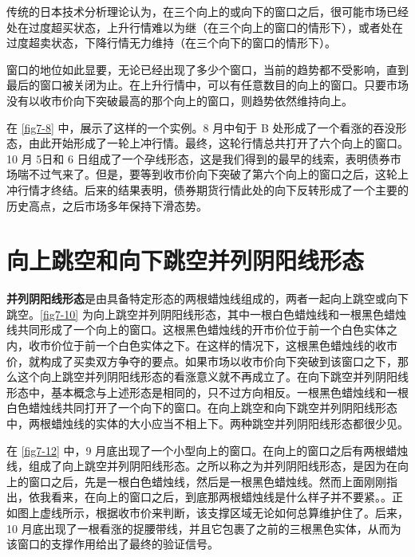 传统的日本技术分析理论认为，在三个向上的或向下的窗口之后，很可能市场已经处在过度超买状态，上升行情难以为继（在三个向上的窗口的情形下），或者处在过度超卖状态，下降行情无力维持（在三个向下的窗口的情形下）。

窗口的地位如此显要，无论已经出现了多少个窗口，当前的趋势都不受影响，直到最后的窗口被关闭为止。在上升行情中，可以有任意数目的向上的窗口。只要市场没有以收市价向下突破最高的那个向上的窗口，则趋势依然维持向上。

在 \autoref{fig7-8} 中，展示了这样的一个实例。8 月中旬于 B 处形成了一个看涨的吞没形态，由此开始形成了一轮上冲行情。最终，这轮行情总共打开了六个向上的窗口。10 月  5日和 6 日组成了一个孕线形态，这是我们得到的最早的线索，表明债券市场喘不过气来了。但是，要等到收市价向下突破了第六个向上的窗口之后，这轮上冲行情才终结。后来的结果表明，债券期货行情此处的向下反转形成了一个主要的历史高点，之后市场多年保持下滑态势。

\section{向上跳空和向下跳空并列阴阳线形态}
\textbf{并列阴阳线形态}是由具备特定形态的两根蜡烛线组成的，两者一起向上跳空或向下跳空。\autoref{fig7-10} 为向上跳空并列阴阳线形态，其中一根白色蜡烛线和一根黑色蜡烛线共同形成了一个向上的窗口。这根黑色蜡烛线的开市价位于前一个白色实体之内，收市价位于前一个白色实体之下。在这样的情况下，这根黑色蜡烛线的收市价，就构成了买卖双方争夺的要点。如果市场以收市价向下突破到该窗口之下，那么这个向上跳空并列阴阳线形态的看涨意义就不再成立了。在向下跳空并列阴阳线形态中，基本概念与上述形态是相同的，只不过方向相反。一根黑色蜡烛线和一根白色蜡烛线共同打开了一个向下的窗口。在向上跳空和向下跳空并列阴阳线形态中，两根蜡烛线的实体的大小应当不相上下。两种跳空并列阴阳线形态都很少见。


在 \autoref{fig7-12} 中，9 月底出现了一个小型向上的窗口。在向上的窗口之后有两根蜡烛线，组成了向上跳空并列阴阳线形态。之所以称之为并列阴阳线形态，是因为在向上的窗口之后，先是一根白色蜡烛线，然后是一根黑色蜡烛线。然而上面刚刚指出，依我看来，在向上的窗口之后，到底那两根蜡烛线是什么样子并不要紧。。正如图上虚线所示，根据收市价来判断，该支撑区域无论如何总算维护住了。后来，10 月底出现了一根看涨的捉腰带线，并且它包裹了之前的三根黑色实体，从而为该窗口的支撑作用给出了最终的验证信号。

